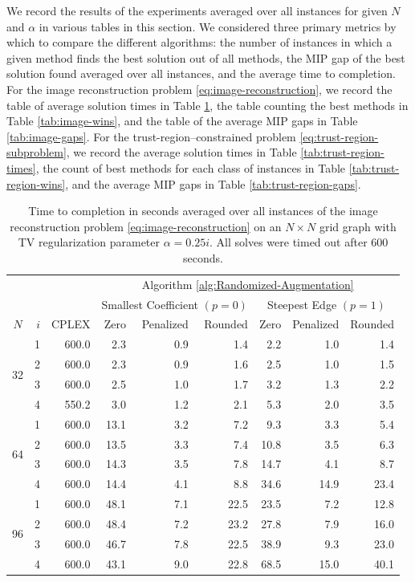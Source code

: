 \documentclass[pdflatex,sn-mathphys-num]{sn-jnl}%
\begin{document}
We record the results of the experiments averaged over all instances for given $N$ and $\alpha$ in various tables in this section. We considered three primary metrics by which to compare the different algorithms:  the number of instances in which a given method finds the best solution out of all methods, the MIP gap of the best solution found averaged over all instances, and the average time to completion. For the image reconstruction problem \eqref{eq:image-reconstruction}, we record the table of average solution times in Table \ref{tab:image-times}, the table counting the best methods in Table \ref{tab:image-wins}, and the table of the average MIP gaps in Table \ref{tab:image-gaps}.
For the trust-region--constrained problem \eqref{eq:trust-region-subproblem}, we record the average solution times in Table \ref{tab:trust-region-times}, the count of best methods for each class of instances in Table \ref{tab:trust-region-wins}, and the average MIP gaps in Table \ref{tab:trust-region-gaps}.

\begin{table}[]
    \centering
\begin{tabular}{cr|r|rrr|rrr}
 &  &       & \multicolumn{6}{c}{Algorithm \ref{alg:Randomized-Augmentation}} \\
 &  &       & \multicolumn{3}{c}{Smallest Coefficient $(p=0)$} & \multicolumn{3}{|c}{Steepest Edge $(p=1)$} \\
 $N$ & $i$ & CPLEX & Zero & Penalized & Rounded & Zero & Penalized & Rounded \\
\hline
\multirow[t]{4}{*}{32} & 1 & 600.0 & 2.3 & 0.9 & 1.4 & 2.2 & 1.0 & 1.4 \\
 & 2 & 600.0 & 2.3 & 0.9 & 1.6 & 2.5 & 1.0 & 1.5 \\
 & 3 & 600.0 & 2.5 & 1.0 & 1.7 & 3.2 & 1.3 & 2.2 \\
 & 4 & 550.2 & 3.0 & 1.2 & 2.1 & 5.3 & 2.0 & 3.5 \\
\hline
\multirow[t]{4}{*}{64} & 1 & 600.0 & 13.1 & 3.2 & 7.2 & 9.3 & 3.3 & 5.4 \\
 & 2 & 600.0 & 13.5 & 3.3 & 7.4 & 10.8 & 3.5 & 6.3 \\
 & 3 & 600.0 & 14.3 & 3.5 & 7.8 & 14.7 & 4.1 & 8.7 \\
 & 4 & 600.0 & 14.4 & 4.1 & 8.8 & 34.6 & 14.9 & 23.4 \\
\hline
\multirow[t]{4}{*}{96} & 1 & 600.0 & 48.1 & 7.1 & 22.5 & 23.5 & 7.2 & 12.8 \\
 & 2 & 600.0 & 48.4 & 7.2 & 23.2 & 27.8 & 7.9 & 16.0 \\
 & 3 & 600.0 & 46.7 & 7.8 & 22.5 & 38.9 & 9.3 & 23.0 \\
 & 4 & 600.0 & 43.1 & 9.0 & 22.8 & 68.5 & 15.0 & 40.1 \\
\end{tabular}
    \caption{Time to completion in seconds averaged over all instances of the image reconstruction problem \eqref{eq:image-reconstruction} on an $N\times N$ grid graph with TV regularization parameter $\alpha = 0.25i$. All solves were timed out after 600 seconds.}
    \label{tab:image-times}
\end{table}
\end{document}
